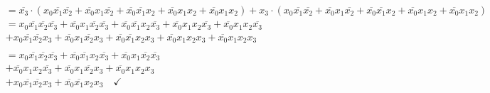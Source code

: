 \documentclass{article}
\newcommand{\nyet}{\overline}
\begin{document}
\begin{enumerate}
\begin{align*}
			&= \nyet{x_3} \cdot (x_0 \nyet{x_1} \nyet{x_2} + \nyet{x_0} x_1 \nyet{x_2} + \nyet{x_0} \nyet{x_1} x_2 + \nyet{x_0} x_1 x_2 + \nyet{x_0} x_1 x_2) + x_3 \cdot (x_0 \nyet{x_1} \nyet{x_2} + \nyet{x_0} x_1 \nyet{x_2} + \nyet{x_0} \nyet{x_1} x_2 + \nyet{x_0} x_1 x_2 + \nyet{x_0} x_1 x_2) \\
			&= x_0 \nyet{x_1} \nyet{x_2} \nyet{x_3} + \nyet{x_0} x_1 \nyet{x_2} \nyet{x_3} + \nyet{x_0} \nyet{x_1} x_2 \nyet{x_3} + \nyet{x_0} x_1 x_2 \nyet{x_3} + \nyet{x_0} x_1 x_2 \nyet{x_3} \\
			&+ x_0 \nyet{x_1} \nyet{x_2} x_3 + \nyet{x_0} x_1 \nyet{x_2} x_3 + \nyet{x_0} \nyet{x_1} x_2 x_3 + \nyet{x_0} x_1 x_2 x_3 + \nyet{x_0} x_1 x_2 x_3 \\\\
			&= x_0 \nyet{x_1} \nyet{x_2} \nyet{x_3} + \nyet{x_0} \nyet{x_1} x_2 \nyet{x_3} + \nyet{x_0} x_1 \nyet{x_2} \nyet{x_3} \\
			&+ \nyet{x_0} x_1 x_2 \nyet{x_3} + \nyet{x_0} x_1 \nyet{x_2} x_3 + \nyet{x_0} x_1 x_2 x_3 \\
			&+ x_0 \nyet{x_1} \nyet{x_2} x_3 + \nyet{x_0} \nyet{x_1} x_2 x_3 \quad \checkmark
		\end{align*}
	\end{enumerate}
\end{document}
